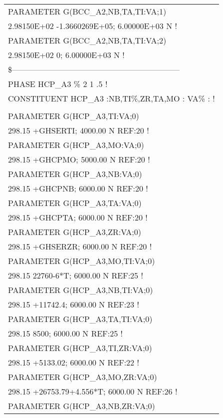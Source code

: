 \begin{longtable}[H]{ l l l }
	PARAMETER G(BCC\_A2,NB,TA,TI:VA;1) & &\\
	\multicolumn{3}{l}{2.98150E+02  -1.3660269E+05; 6.00000E+03  N  !}\\
	PARAMETER G(BCC\_A2,NB,TA,TI:VA;2) & & \\
	\multicolumn{3}{l}{2.98150E+02  0; 6.00000E+03 N !}\\
	\multicolumn{3}{l}{\$---------------------------------------------------------------}\\
	\multicolumn{3}{l}{PHASE HCP\_A3  \%  2 1   .5 !}\\
	\multicolumn{3}{l}{CONSTITUENT HCP\_A3  :NB,TI\%,ZR,TA,MO : VA\% :  !}\\
	& & \\
	PARAMETER G(HCP\_A3,TI:VA;0) & & \\
	\multicolumn{3}{l}{298.15 +GHSERTI; 4000.00 N REF:20 !}\\
	PARAMETER G(HCP\_A3,MO:VA;0) & & \\
	\multicolumn{3}{l}{298.15 +GHCPMO; 5000.00 N REF:20 !}\\	
	PARAMETER G(HCP\_A3,NB:VA;0) & & \\
	\multicolumn{3}{l}{298.15 +GHCPNB; 6000.00 N REF:20 !}\\
	PARAMETER G(HCP\_A3,TA:VA;0) & &\\
	\multicolumn{3}{l}{298.15 +GHCPTA; 6000.00 N REF:20 !}\\ 
	PARAMETER G(HCP\_A3,ZR:VA;0) & & \\
	\multicolumn{3}{l}{298.15 +GHSERZR; 6000.00 N REF:20 !}\\	
	PARAMETER G(HCP\_A3,MO,TI:VA;0) & & \\
	\multicolumn{3}{l}{298.15   22760-6*T; 6000.00 N REF:25 !}\\
	PARAMETER G(HCP\_A3,NB,TI:VA;0) & & \\
	\multicolumn{3}{l}{298.15  +11742.4; 6000.00 N REF:23   !}\\
	PARAMETER G(HCP\_A3,TA,TI:VA;0) & &\\
	\multicolumn{3}{l}{298.15  8500; 6000.00 N REF:25 !}\\	 
	PARAMETER G(HCP\_A3,TI,ZR:VA;0) & & \\
	\multicolumn{3}{l}{298.15  +5133.02; 6000.00 N  REF:22  !}\\
	PARAMETER G(HCP\_A3,MO,ZR:VA;0) & & \\
	\multicolumn{3}{l}{298.15  +26753.79+4.556*T; 6000.00 N REF:26 !}\\	 
	PARAMETER G(HCP\_A3,NB,ZR:VA;0) & & \\

\end{longtable}
